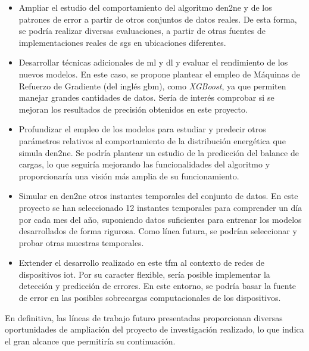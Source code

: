 \begin{itemize}
    \item Ampliar el estudio del comportamiento del algoritmo \gls{den2ne} y de los patrones de error a partir de otros conjuntos de datos reales. De esta forma, se podría realizar diversas evaluaciones, a partir de otras fuentes de implementaciones reales de \gls{sg}s en ubicaciones diferentes.
    \item Desarrollar técnicas adicionales de \gls{ml} y \gls{dl} y evaluar el rendimiento de los nuevos modelos. En este caso, se propone plantear el empleo de Máquinas de Refuerzo de Gradiente (del inglés \gls{gbm}), como \textit{XGBoost}, ya que permiten manejar grandes cantidades de datos. Sería de interés comprobar si se mejoran los resultados de precisión obtenidos en este proyecto.
    \item Profundizar el empleo de los modelos para estudiar y predecir otros parámetros relativos al comportamiento de la distribución energética que simula \gls{den2ne}. Se podría plantear un estudio de la predicción del balance de cargas, lo que seguiría mejorando las funcionalidades del algoritmo y proporcionaría una visión más amplia de su funcionamiento.
    \item Simular en \gls{den2ne} otros instantes temporales del conjunto de datos. En este proyecto se han seleccionado 12 instantes temporales para comprender un día por cada mes del año, suponiendo datos suficientes para entrenar los modelos desarrollados de forma rigurosa. Como línea futura, se podrían seleccionar y probar otras muestras temporales.
    \item Extender el desarrollo realizado en este \gls{tfm} al contexto de redes de dispositivos \gls{iot}. Por su caracter flexible, sería posible implementar la detección y predicción de errores. En este entorno, se podría basar la fuente de error en las posibles sobrecargas computacionales de los dispositivos.
\end{itemize}

En definitiva, las líneas de trabajo futuro presentadas proporcionan diversas oportunidades de ampliación del proyecto de investigación realizado, lo que indica el gran alcance que permitiría su continuación.
